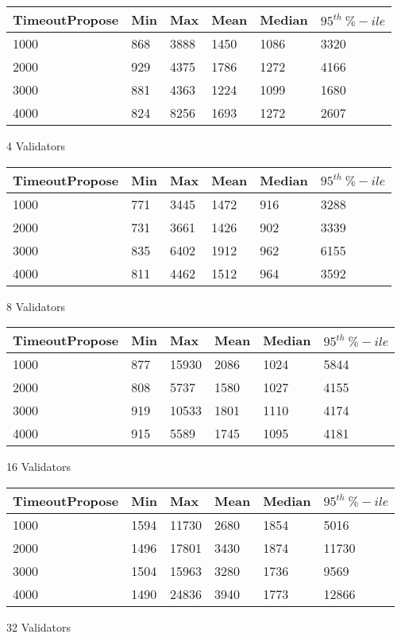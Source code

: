 
\begin{subtable}{.5 \linewidth}
	\centering
	\begin{tabular}{| l | l | l | l | l | l | }
		\hline
		TimeoutPropose & Min & Max & Mean & Median & $95^{th} \ \%-ile$ \\ \hline
		1000 & 868 & 3888 & 1450 & 1086 & 3320 \\ \hline
		2000 & 929 & 4375 & 1786 & 1272 & 4166 \\ \hline
		3000 & 881 & 4363 & 1224 & 1099 & 1680 \\ \hline
		4000 & 824 & 8256 & 1693 & 1272 & 2607 \\ \hline
	\end{tabular}
	\caption{4 Validators}
\end{subtable}


\begin{subtable}{.5 \linewidth}
	\centering
	\begin{tabular}{| l | l | l | l | l | l | }
		\hline
		TimeoutPropose & Min & Max & Mean & Median & $95^{th} \ \%-ile$ \\ \hline
		1000 & 771 & 3445 & 1472 & 916 & 3288 \\ \hline
		2000 & 731 & 3661 & 1426 & 902 & 3339 \\ \hline
		3000 & 835 & 6402 & 1912 & 962 & 6155 \\ \hline
		4000 & 811 & 4462 & 1512 & 964 & 3592 \\ \hline
	\end{tabular}
	\caption{8 Validators}
\end{subtable}


\begin{subtable}{.5 \linewidth}
	\centering
	\begin{tabular}{| l | l | l | l | l | l | }
		\hline
		TimeoutPropose & Min & Max & Mean & Median & $95^{th} \ \%-ile$ \\ \hline
		1000 & 877 & 15930 & 2086 & 1024 & 5844 \\ \hline
		2000 & 808 & 5737 & 1580 & 1027 & 4155 \\ \hline
		3000 & 919 & 10533 & 1801 & 1110 & 4174 \\ \hline
		4000 & 915 & 5589 & 1745 & 1095 & 4181 \\ \hline
	\end{tabular}
	\caption{16 Validators}
\end{subtable}


\begin{subtable}{.5 \linewidth}
	\centering
	\begin{tabular}{| l | l | l | l | l | l | }
		\hline
		TimeoutPropose & Min & Max & Mean & Median & $95^{th} \ \%-ile$ \\ \hline
		1000 & 1594 & 11730 & 2680 & 1854 & 5016 \\ \hline
		2000 & 1496 & 17801 & 3430 & 1874 & 11730 \\ \hline
		3000 & 1504 & 15963 & 3280 & 1736 & 9569 \\ \hline
		4000 & 1490 & 24836 & 3940 & 1773 & 12866 \\ \hline
	\end{tabular}
	\caption{32 Validators}
\end{subtable}

